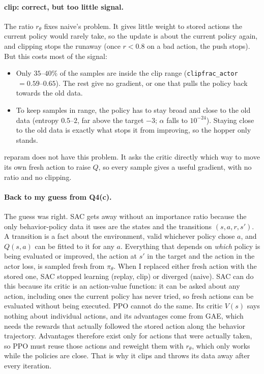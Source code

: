 \documentclass[11pt]{article}
\newcommand{\code}[1]{\texttt{#1}}
\begin{document}
\paragraph{clip: correct, but too little signal.}
The ratio $r_\theta$ fixes naive's problem. It gives little weight to stored actions the current policy would
rarely take, so the update is about the current policy again, and clipping stops the runaway (once $r<0.8$ on
a bad action, the push stops). But this costs most of the signal:
\begin{itemize}[nosep]
  \item Only $35$--$40\%$ of the samples are inside the clip range (\code{clipfrac\_actor}$\,=0.59$--$0.65$). The
        rest give no gradient, or one that pulls the policy back towards the old data.
  \item To keep samples in range, the policy has to stay broad and close to the old data (entropy $0.5$--$2$,
        far above the target $-3$; $\alpha$ falls to $10^{-24}$). Staying close to the old data is exactly what
        stops it from improving, so the hopper only stands.
\end{itemize}
reparam does not have this problem. It asks the critic directly which way to move its own fresh action to raise
$Q$, so every sample gives a useful gradient, with no ratio and no clipping.

\paragraph{Back to my guess from Q4(c).} The guess was right. SAC gets away without an importance ratio because the
only behavior-policy data it uses are the states and the transitions $(s,a,r,s')$. A transition is a fact about the
environment, valid whichever policy chose $a$, and $Q(s,a)$ can be fitted to it for any $a$. Everything that depends
on \emph{which} policy is being evaluated or improved, the action at $s'$ in the target and the action in the actor
loss, is sampled fresh from $\pi_\theta$. When I replaced either fresh action with the stored one, SAC stopped learning
(replay, clip) or diverged (naive). SAC can do this because its critic is an action-value function: it can be asked
about any action, including ones the current policy has never tried, so fresh actions can be evaluated without being
executed. PPO cannot do the same. Its critic $V(s)$ says nothing about individual actions, and its advantages come from
GAE, which needs the rewards that actually followed the stored action along the behavior trajectory. Advantages
therefore exist only for actions that were actually taken, so PPO must reuse those actions and reweight them with $r_\theta$,
which only works while the policies are close. That is why it clips and throws its data away after every iteration.
\end{document}
